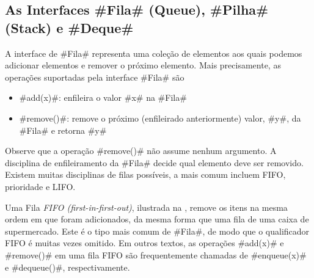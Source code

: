 \subsection{As Interfaces #Fila# (Queue), #Pilha# (Stack) e #Deque#}

A interface de #Fila# representa uma coleção de elementos aos quais podemos
adicionar elementos e remover o próximo elemento. Mais precisamente, as
operações suportadas pela interface #Fila# são
\begin{itemize}
	\item #add(x)#: enfileira o valor #x# na #Fila#
	\item #remove()#: remove o próximo (enfileirado anteriormente) valor, #y#, da
	#Fila# e retorna #y#
\end{itemize}
Observe que a operação #remove()# não assume nenhum argumento. A disciplina de
enfileiramento da #Fila# decide qual elemento deve ser removido. Existem muitas
disciplinas de filas possíveis, a mais comum incluem FIFO, prioridade e LIFO.

Uma Fila \emph{FIFO (first-in-first-out)},
%
%
ilustrada na 
, remove os itens na mesma ordem em que foram adicionados, da
mesma 
forma que uma fila de uma caixa de supermercado. Este é o tipo mais comum de
#Fila#, de modo que o 
qualificador FIFO é muitas vezes omitido. Em outros textos, as operações
#add(x)# e #remove()# 
em uma fila FIFO são frequentemente chamadas de #enqueue(x)# e #dequeue()#,
respectivamente.

